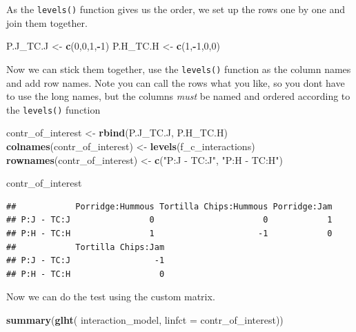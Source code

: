 \documentclass[
]{book}
\newenvironment{Shaded}{\begin{snugshade}}{\end{snugshade}}
\newcommand{\DataTypeTok}[1]{\textcolor[rgb]{0.13,0.29,0.53}{#1}}
\newcommand{\DecValTok}[1]{\textcolor[rgb]{0.00,0.00,0.81}{#1}}
\newcommand{\KeywordTok}[1]{\textcolor[rgb]{0.13,0.29,0.53}{\textbf{#1}}}
\newcommand{\NormalTok}[1]{#1}
\newcommand{\OperatorTok}[1]{\textcolor[rgb]{0.81,0.36,0.00}{\textbf{#1}}}
\newcommand{\StringTok}[1]{\textcolor[rgb]{0.31,0.60,0.02}{#1}}
\begin{document}
As the \texttt{levels()} function gives us the order, we set up the rows one by one and join them together.

\begin{Shaded}
\begin{Highlighting}[]
\NormalTok{P.J_TC.J <-}\StringTok{ }\KeywordTok{c}\NormalTok{(}\DecValTok{0}\NormalTok{,}\DecValTok{0}\NormalTok{,}\DecValTok{1}\NormalTok{,}\OperatorTok{-}\DecValTok{1}\NormalTok{)}
\NormalTok{P.H_TC.H <-}\StringTok{ }\KeywordTok{c}\NormalTok{(}\DecValTok{1}\NormalTok{,}\OperatorTok{-}\DecValTok{1}\NormalTok{,}\DecValTok{0}\NormalTok{,}\DecValTok{0}\NormalTok{)}
\end{Highlighting}
\end{Shaded}

Now we can stick them together, use the \texttt{levels()} function as the column names and add row names. Note you can call the rows what you like, so you dont have to use the long names, but the columns \emph{must} be named and ordered according to the \texttt{levels()} function

\begin{Shaded}
\begin{Highlighting}[]
\NormalTok{contr_of_interest <-}\StringTok{ }\KeywordTok{rbind}\NormalTok{(P.J_TC.J, P.H_TC.H)}
\KeywordTok{colnames}\NormalTok{(contr_of_interest) <-}\StringTok{ }\KeywordTok{levels}\NormalTok{(f_c_interactions)}
\KeywordTok{rownames}\NormalTok{(contr_of_interest) <-}\StringTok{ }\KeywordTok{c}\NormalTok{(}\StringTok{"P:J - TC:J"}\NormalTok{,}
          \StringTok{"P:H - TC:H"}\NormalTok{)}

\NormalTok{contr_of_interest}
\end{Highlighting}
\end{Shaded}

\begin{verbatim}
##            Porridge:Hummous Tortilla Chips:Hummous Porridge:Jam
## P:J - TC:J                0                      0            1
## P:H - TC:H                1                     -1            0
##            Tortilla Chips:Jam
## P:J - TC:J                 -1
## P:H - TC:H                  0
\end{verbatim}

Now we can do the test using the custom matrix.

\begin{Shaded}
\begin{Highlighting}[]
\KeywordTok{summary}\NormalTok{(}\KeywordTok{glht}\NormalTok{( interaction_model, }\DataTypeTok{linfct =}\NormalTok{ contr_of_interest))}
\end{Highlighting}
\end{Shaded}
\end{document}
